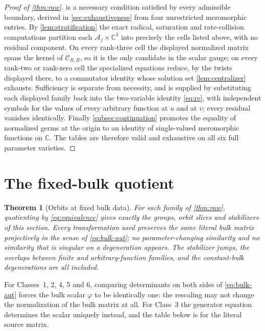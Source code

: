 \documentclass[11pt,reqno]{amsart}
\theoremstyle{plain}
\newtheorem{theorem}{Theorem}[section]
\theoremstyle{definition}
\theoremstyle{remark}
\numberwithin{equation}{section}
\newcommand{\C}{\mathbb C}
\begin{document}
\begin{proof}[Proof of \cref{thm:raw}]
 is a necessary condition satisfied by every
admissible boundary, derived in \cref{sec:exhaustiveness} from four unrestricted
meromorphic entries. By \cref{lem:stratification} the exact radical, saturation
and rate-collision computations partition each
$\mathcal A_j\times\C^3$ into precisely the cells listed above, with no residual
component. On every rank-three cell the displayed normalized matrix spans the
kernel of $\mathcal C_{R,B}$, so it is the only candidate in the scalar gauge; on
every rank-two or rank-zero cell the specialized equations reduce, by the twists
displayed there, to a commutator identity whose solution set
\cref{lem:centralizer} exhausts. Sufficiency is separate from necessity, and is
supplied by substituting each displayed family back into the two-variable
identity \cref{eq:re}, with independent symbols for the values of every arbitrary
function at $u$ and at $v$; every residual vanishes identically. Finally
\cref{subsec:continuation} promotes the equality of normalized germs at the
origin to an identity of single-valued meromorphic functions on $\C$. The tables
are therefore valid and exhaustive on all six full parameter varieties.
\end{proof}

\section{The fixed-bulk quotient}
\label{sec:quotient}

\begin{theorem}[Orbits at fixed bulk data]
\label{thm:quotient}
For each family of \cref{thm:raw}, quotienting by \cref{eq:equivalence} gives
exactly the groups, orbit slices and stabilizers of this section. Every
transformation used preserves the same literal bulk matrix projectively in the
sense of \cref{eq:bulk-aut}; no parameter-changing similarity and no similarity
that is singular on a degeneration appears. The stabilizer jumps, the overlaps
between finite and arbitrary-function families, and the constant-bulk
degenerations are all included.
\end{theorem}

For Classes~1, 2, 4, 5 and 6, comparing determinants on both sides of
\cref{eq:bulk-aut} forces the bulk scalar $\varphi$ to be identically one: the
rescaling may not change the normalization of the bulk matrix at all. For
Class~3 the generator equation determines the scalar uniquely instead, and the
table below is for the literal source matrix.
\end{document}
